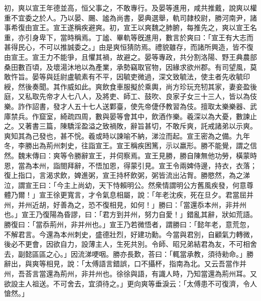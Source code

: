 \begin{pinyinscope}
初，爽以宣王年德並高，恒父事之，不敢專行。及晏等進用，咸共推戴，說爽以權重不宜委之於人。乃以晏、颺、謐為尚書，晏典選舉，軌司隷校尉，勝河南尹，諸事希復由宣王。宣王遂稱疾避爽。初，宣王以爽魏之肺腑，每推先之，爽以宣王名重，亦引身卑下，當時稱焉。丁謐、畢軌等旣進用，數言於爽曰：「宣王有大志而甚得民心，不可以推誠委之。」由是爽恒猜防焉。禮貌雖存，而諸所興造，皆不復由宣王。宣王力不能爭，且懼其禍，故避之。晏等專政，共分割洛陽、野王典農部桑田數百頃，及壞湯沐地以為產業，承勢竊取官物，因緣求欲州郡。有司望風，莫敢忤旨。晏等與廷尉盧毓素有不平，因毓吏微過，深文致毓法，使主者先收毓印綬，然後奏聞。其作威如此。爽飲食車服擬於乘輿，尚方珍玩充牣其家，妻妾盈後庭，又私取先帝才人七八人，及將吏、師工、鼓吹、良家子女三十三人，皆以為伎樂。詐作詔書，發才人五十七人送鄴臺，使先帝倢伃教習為伎。擅取太樂樂器、武庫禁兵。作窟室，綺疏四周，數與晏等會其中，飲酒作樂。羲深以為大憂，數諫止之。又著書三篇，陳驕淫盈溢之致禍敗，辭旨甚切，不敢斥爽，託戒諸弟以示爽。爽知其為己發也，甚不恱。羲或時以諫喻不納，涕泣而起。宣王密為之備。九年冬，李勝出為荊州刺史，往詣宣王。宣王稱疾困篤，示以羸形。勝不能覺，謂之信然。魏末傳曰：爽等令勝辭宣王，并伺察焉。宣王見勝，勝自陳無他功勞，橫蒙時恩，當為本州，詣閤拜辭，不悟加恩，得蒙引見。宣王令兩婢侍邊，持衣，衣落；復上指口，言渴求飲，婢進粥，宣王持杯飲粥，粥皆流出沾胷。勝愍然，為之涕泣，謂宣王曰：「今主上尚幼，天下恃賴明公。然衆情謂明公方舊風疾發，何意尊體乃爾！」宣王徐更寬言，才令氣息相屬，說：「年老沈疾，死在旦夕。君當屈并州，并州近胡，好善為之，恐不復相見，如何！」勝曰：「當還忝本州，非并州也。」宣王乃復陽為昏謬，曰：「君方到并州，努力自愛！」錯亂其辭，狀如荒語。勝復曰：「當忝荊州，非并州也。」宣王乃若微悟者，謂勝曰：「懿年老，意荒忽，不解君言。今還為本州刺史，盛德壯烈，好建功勳。今當與君別，自顧氣力轉微，後必不更會，因欲自力，設薄主人，生死共別。令師、昭兄弟結君為友，不可相舍去，副懿區區之心。」因流涕哽咽。勝亦長歎，荅曰：「輒當承教，須待勑命。」勝辭出，與爽等相見，說：「太傅語言錯誤，口不攝杯，指南為北。又云吾當作并州，吾荅言當還為荊州，非并州也。徐徐與語，有識人時，乃知當還為荊州耳。又欲設主人祖送。不可舍去，宜須待之。」更向爽等垂淚云：「太傅患不可復濟，令人愴然。」


\end{pinyinscope}
